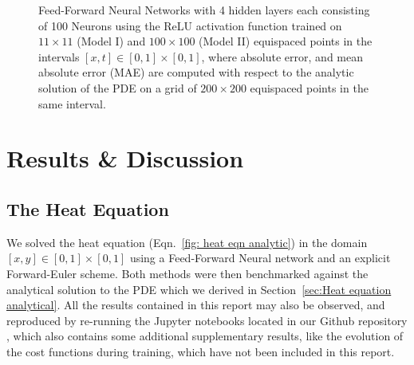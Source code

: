 \documentclass[reprint, english, nofootinbib]{revtex4-2}
\begin{document}
\begin{figure}[h!tb]
{    }
    \caption{\label{fig:ReLU composite figure}Feed-Forward Neural Networks with 4 hidden layers each consisting of 100 Neurons using the ReLU activation function trained on $11\times11$ (Model I) and $100\times100$ (Model II) equispaced points in the intervals $[x,t]\in[0,1]\times[0,1]$, where absolute error, and mean absolute error (MAE) are computed with respect to the analytic solution of the PDE on a grid of $200\times200$ equispaced points in the same interval.}
\end{figure}

\section{Results \& Discussion}

\subsection{The Heat Equation}

\noindent
We solved the heat equation (Eqn.~\ref{fig: heat eqn analytic}) in the domain $[x,y] \in [0,1]\times[0,1]$ using a Feed-Forward Neural network and an explicit Forward-Euler scheme. Both methods were then benchmarked against the analytical solution to the PDE which we derived in Section~\ref{sec:Heat equation analytical}. All the results contained in this report may also be observed, and reproduced by re-running the Jupyter notebooks located in our Github repository \cite{github_repo}, which also contains some additional supplementary results, like the evolution of the cost functions during training, which have not been included in this report.
\end{document}
